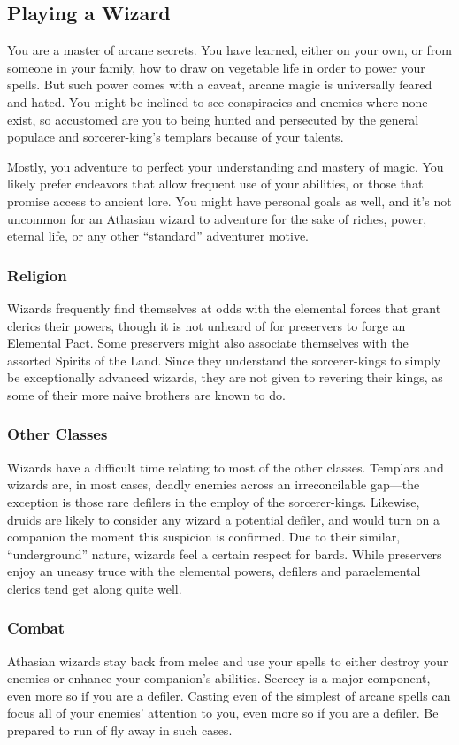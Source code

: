 \subsection{Playing a Wizard}
You are a master of arcane secrets. You have learned, either on your own, or from someone in your family, how to draw on vegetable life in order to power your spells. But such power comes with a caveat, arcane magic is universally feared and hated. You might be inclined to see conspiracies and enemies where none exist, so accustomed are you to being hunted and persecuted by the general populace and sorcerer-king's templars because of your talents.

Mostly, you adventure to perfect your understanding and mastery of magic. You likely prefer endeavors that allow frequent use of your abilities, or those that promise access to ancient lore. You might have personal goals as well, and it's not uncommon for an Athasian wizard to adventure for the sake of riches, power, eternal life, or any other ``standard'' adventurer motive.

\subsubsection{Religion}
Wizards frequently find themselves at odds with the elemental forces that grant clerics their powers, though it is not unheard of for preservers to forge an Elemental Pact. Some preservers might also associate themselves with the assorted Spirits of the Land. Since they understand the sorcerer-kings to simply be exceptionally advanced wizards, they are not given to revering their kings, as some of their more naive brothers are known to do.

\subsubsection{Other Classes}
Wizards have a difficult time relating to most of the other classes. Templars and wizards are, in most cases, deadly enemies across an irreconcilable gap---the exception is those rare defilers in the employ of the sorcerer-kings. Likewise, druids are likely to consider any wizard a potential defiler, and would turn on a companion the moment this suspicion is confirmed. Due to their similar, ``underground'' nature, wizards feel a certain respect for bards. While preservers enjoy an uneasy truce with the elemental powers, defilers and paraelemental clerics tend get along quite well.

\subsubsection{Combat}
Athasian wizards stay back from melee and use your spells to either destroy your enemies or enhance your companion's abilities. Secrecy is a major component, even more so if you are a defiler. Casting even of the simplest of arcane spells can focus all of your enemies' attention to you, even more so if you are a defiler. Be prepared to run of fly away in such cases.

